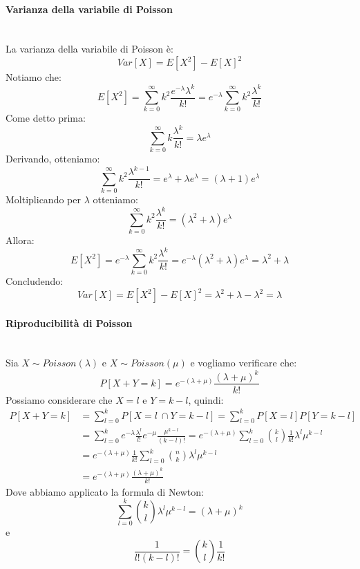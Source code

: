 \documentclass[12pt]{report}
\begin{document}
  	 	\paragraph{Varianza della variabile di Poisson} \quad \\
  	 	La varianza della variabile di Poisson è:
  	 	\[
  	 	Var[X] = E[X^2] - E[X]^2
  	 	\]
  	 	Notiamo che:
  	 	\[
  	 	E[X^2] = \sum_{k=0}^{\infty}k^2\frac{e^{-\lambda}\lambda^k}{k!} = e^{-\lambda}\sum_{k=0}^{\infty}k^2\frac{\lambda^k}{k!}
  	 	\]
  	 	Come detto prima:
  	 	\[
  	 	\sum_{k=0}^{\infty}k\frac{\lambda^k}{k!} = \lambda e^{\lambda}
  	 	\]
  	 	Derivando, otteniamo:
  	 	\[
  	 	\sum_{k=0}^{\infty}k^2\frac{\lambda^{k-1}}{k!} = e^\lambda + \lambda e^\lambda = (\lambda + 1)e^\lambda
  	 	\]
  	 	Moltiplicando per $\lambda$ otteniamo:
  	 	\[
  	 	\sum_{k=0}^{\infty}k^2\frac{\lambda^k}{k!} = (\lambda^2 + \lambda)e^\lambda
  	 	\]
  	 	Allora:
  	 	\[
  	 	E[X^2] = e^{-\lambda}\sum_{k=0}^{\infty}k^2\frac{\lambda^k}{k!} = e^{-\lambda}(\lambda^2+\lambda)e^\lambda = \lambda^2 + \lambda
  	 	\]
  	 	Concludendo:
  	 	\[
  	 	Var[X] = E[X^2] - E[X]^2 = \lambda^2+\lambda - \lambda^2 = \lambda
  	 	\]
  	 	\paragraph{Riproducibilità di Poisson} \quad \\
  	 	Sia $X \sim Poisson(\lambda)$ e $X \sim Poisson(\mu)$ e vogliamo verificare che:
  	 	\[
  	 	P[X+Y=k] = e^{-(\lambda + \mu)}\frac{(\lambda + \mu)^k}{k!}
  	 	\]
  	 	Possiamo considerare che $X=l$ e $Y = k-l$, quindi:
  	 	\begin{align*}
  	 		P[X + Y = k] &= \sum_{l=0}^{k}P[X = l\ \cap Y = k - l] = \sum_{l=0}^{k}P[X=l]P[Y=k-l]\\
  	 		&= \sum_{l=0}^{k}e^{-\lambda}\frac{\lambda^l}{l!}e^{-\mu}\frac{\mu^{k-l}}{(k-l)!} = e^{-(\lambda+\mu)}\sum_{l=0}^{k}\binom{k}{l}\frac{1}{k!}\lambda^l\mu^{k-l} \\
  	 		&= e^{-(\lambda+\mu)}\frac{1}{k!}\sum_{l=0}^{k}\binom{n}{k}\lambda^l\mu^{k-l} \\
  	 		&= e^{-(\lambda+\mu)}\frac{(\lambda+\mu)^k}{k!}
  	 	\end{align*}
  	 	Dove abbiamo applicato la formula di Newton:
  	 	\[
  	 	\sum_{l=0}^{k}\binom{k}{l}\lambda^l\mu^{k-l} = (\lambda + \mu)^k
  	 	\]
  	 	e
  	 	\[
  		\frac{1}{l!(k-l)!} = \binom{k}{l}\frac{1}{k!}
  	 	\]
\end{document}
